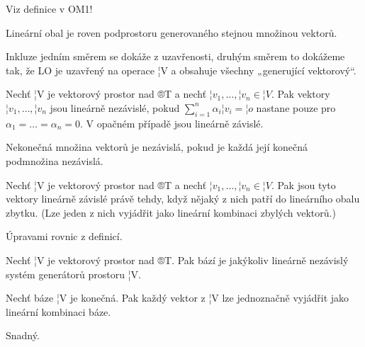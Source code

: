 \documentclass[12pt]{article}					%
\begin{document}
    \begin{definice}
        Viz definice v OM1!
    \end{definice}

    \begin{veta}
        Lineární obal je roven podprostoru generovaného stejnou množinou vektorů.

        \begin{dukazin}
            Inkluze jedním směrem se dokáže z uzavřenosti, druhým směrem to dokážeme tak, že LO je uzavřený na operace ¦V a obsahuje všechny „generující vektorový“.
        \end{dukazin}
    \end{veta}

    \begin{definice}
        Nechť ¦V je vektorový prostor nad ®T a nechť $¦v_1, …, ¦v_n \in ¦V$. Pak vektory $¦v_1, …, ¦v_n$ jsou lineárně nezávislé, pokud $\sum_{i=1}^n \alpha_i ¦v_i = ¦o$ nastane pouze pro $\alpha_1 = … = \alpha_n = 0$. V opačném případě jsou lineárně závislé.
    \end{definice}

    \begin{definice}
        Nekonečná množina vektorů je nezávislá, pokud je každá její konečná podmnožina nezávislá.
    \end{definice}

    \begin{veta}
        Nechť ¦V je vektorový prostor nad ®T a nechť $¦v_1, …, ¦v_n \in ¦V$. Pak jsou tyto vektory lineárně závislé právě tehdy, když nějaký z nich patří do lineárního obalu zbytku. (Lze jeden z nich vyjádřit jako lineární kombinaci zbylých vektorů.)
        \begin{dukazin}
            Úpravami rovnic z definicí.
        \end{dukazin}
    \end{veta}

    \begin{definice}
        Nechť ¦V je vektorový prostor nad ®T. Pak bází je jakýkoliv lineárně nezávislý systém generátorů prostoru ¦V.
    \end{definice}

    \begin{veta}
        Nechť báze ¦V je konečná. Pak každý vektor z ¦V lze jednoznačně vyjádřit jako lineární kombinaci báze.
        \begin{dukazin}
            Snadný.
        \end{dukazin}
    \end{veta}
\end{document}
